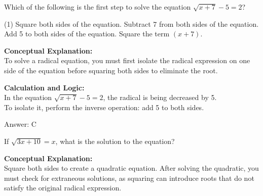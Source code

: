 \documentclass[11pt,paper=a4,answers]{exam}
\begin{document}
\begin{questions}
\pointsinrightmargin
\pointsdroppedatright
\marksnotpoints
{}
\pointformat{\boldmath\themarginpoints}
\bracketedpoints



\question
Which of the following is the first step to solve the equation $\sqrt{x + 7} - 5 = 2$?
\begin{tasks}(1)
    \task Square both sides of the equation.
    \task Subtract 7 from both sides of the equation.
    \task Add 5 to both sides of the equation.
    \task Square the term $(x+7)$.
\end{tasks}

\begin{solution}
\textbf{Conceptual Explanation:} \\
To solve a radical equation, you must first isolate the radical expression on one side of the equation before squaring both sides to eliminate the root.

\vspace{20pt}

\textbf{Calculation and Logic:} \\
In the equation $\sqrt{x + 7} - 5 = 2$, the radical is being decreased by 5. \\
To isolate it, perform the inverse operation: add 5 to both sides.

\vspace{25pt}

Answer: \colorbox{yellow!100}{C}
\end{solution}

\vspace{40pt}

\question
If $\sqrt{3x + 10} = x$, what is the solution to the equation?

\begin{solution}
\textbf{Conceptual Explanation:} \\
Square both sides to create a quadratic equation. After solving the quadratic, you must check for extraneous solutions, as squaring can introduce roots that do not satisfy the original radical expression.


\end{solution}
\end{questions}
\end{document}
